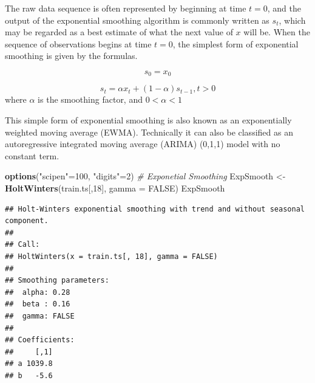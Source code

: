 \documentclass[12pt,openany]{book}
\newenvironment{Shaded}{\begin{snugshade}}{\end{snugshade}}
\newcommand{\CommentTok}[1]{\textcolor[rgb]{0.56,0.35,0.01}{\textit{#1}}}
\newcommand{\DataTypeTok}[1]{\textcolor[rgb]{0.13,0.29,0.53}{#1}}
\newcommand{\DecValTok}[1]{\textcolor[rgb]{0.00,0.00,0.81}{#1}}
\newcommand{\KeywordTok}[1]{\textcolor[rgb]{0.13,0.29,0.53}{\textbf{#1}}}
\newcommand{\NormalTok}[1]{#1}
\newcommand{\OtherTok}[1]{\textcolor[rgb]{0.56,0.35,0.01}{#1}}
\newcommand{\StringTok}[1]{\textcolor[rgb]{0.31,0.60,0.02}{#1}}
\begin{document}
The raw data sequence is often represented by beginning at time \(t = 0\), and the output of the exponential smoothing algorithm is commonly written as \({s_t}\), which may be regarded as a best estimate of what the next value of \(x\) will be. When the sequence of observations begins at time \(t = 0\), the simplest form of exponential smoothing is given by the formulas.

\[s_0 = x_0\]

\[ s_t =  \alpha x_t + (1 - \alpha) s_{t-1}, t > 0\]
where \(\alpha\) is the smoothing factor, and \(0 < \alpha < 1\)

This simple form of exponential smoothing is also known as an exponentially weighted moving average (EWMA). Technically it can also be classified as an autoregressive integrated moving average (ARIMA) (0,1,1) model with no constant term.

\begin{Shaded}
\begin{Highlighting}[]
\KeywordTok{options}\NormalTok{(}\StringTok{"scipen"}\NormalTok{=}\DecValTok{100}\NormalTok{, }\StringTok{"digits"}\NormalTok{=}\DecValTok{2}\NormalTok{)}
\CommentTok{# Exponetial Smoothing}
\NormalTok{ExpSmooth <-}\StringTok{ }\KeywordTok{HoltWinters}\NormalTok{(train.ts[,}\DecValTok{18}\NormalTok{], }\DataTypeTok{gamma =} \OtherTok{FALSE}\NormalTok{)}
\NormalTok{ExpSmooth}
\end{Highlighting}
\end{Shaded}

\begin{verbatim}
## Holt-Winters exponential smoothing with trend and without seasonal component.
## 
## Call:
## HoltWinters(x = train.ts[, 18], gamma = FALSE)
## 
## Smoothing parameters:
##  alpha: 0.28
##  beta : 0.16
##  gamma: FALSE
## 
## Coefficients:
##     [,1]
## a 1039.8
## b   -5.6
\end{verbatim}
\end{document}
